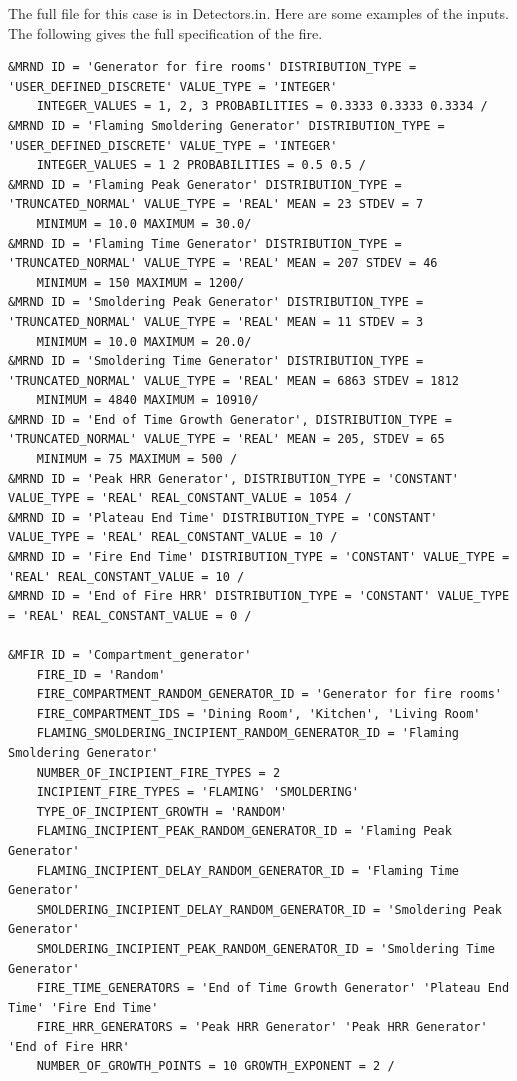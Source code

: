 \documentclass[12pt,twoside]{book}
\begin{document}
The full file for this case is in Detectors.in. Here are some examples of the inputs. The following gives the full specification of the fire.

\vspace{\baselineskip}
\begin{lstlisting}
&MRND ID = 'Generator for fire rooms' DISTRIBUTION_TYPE = 'USER_DEFINED_DISCRETE' VALUE_TYPE = 'INTEGER'
    INTEGER_VALUES = 1, 2, 3 PROBABILITIES = 0.3333 0.3333 0.3334 /
&MRND ID = 'Flaming Smoldering Generator' DISTRIBUTION_TYPE = 'USER_DEFINED_DISCRETE' VALUE_TYPE = 'INTEGER'
    INTEGER_VALUES = 1 2 PROBABILITIES = 0.5 0.5 /
&MRND ID = 'Flaming Peak Generator' DISTRIBUTION_TYPE = 'TRUNCATED_NORMAL' VALUE_TYPE = 'REAL' MEAN = 23 STDEV = 7
    MINIMUM = 10.0 MAXIMUM = 30.0/
&MRND ID = 'Flaming Time Generator' DISTRIBUTION_TYPE = 'TRUNCATED_NORMAL' VALUE_TYPE = 'REAL' MEAN = 207 STDEV = 46
    MINIMUM = 150 MAXIMUM = 1200/
&MRND ID = 'Smoldering Peak Generator' DISTRIBUTION_TYPE = 'TRUNCATED_NORMAL' VALUE_TYPE = 'REAL' MEAN = 11 STDEV = 3
    MINIMUM = 10.0 MAXIMUM = 20.0/
&MRND ID = 'Smoldering Time Generator' DISTRIBUTION_TYPE = 'TRUNCATED_NORMAL' VALUE_TYPE = 'REAL' MEAN = 6863 STDEV = 1812
    MINIMUM = 4840 MAXIMUM = 10910/
&MRND ID = 'End of Time Growth Generator', DISTRIBUTION_TYPE = 'TRUNCATED_NORMAL' VALUE_TYPE = 'REAL' MEAN = 205, STDEV = 65
    MINIMUM = 75 MAXIMUM = 500 /
&MRND ID = 'Peak HRR Generator', DISTRIBUTION_TYPE = 'CONSTANT' VALUE_TYPE = 'REAL' REAL_CONSTANT_VALUE = 1054 /
&MRND ID = 'Plateau End Time' DISTRIBUTION_TYPE = 'CONSTANT' VALUE_TYPE = 'REAL' REAL_CONSTANT_VALUE = 10 /
&MRND ID = 'Fire End Time' DISTRIBUTION_TYPE = 'CONSTANT' VALUE_TYPE = 'REAL' REAL_CONSTANT_VALUE = 10 /
&MRND ID = 'End of Fire HRR' DISTRIBUTION_TYPE = 'CONSTANT' VALUE_TYPE = 'REAL' REAL_CONSTANT_VALUE = 0 /

&MFIR ID = 'Compartment_generator'
	FIRE_ID = 'Random'
	FIRE_COMPARTMENT_RANDOM_GENERATOR_ID = 'Generator for fire rooms'
    FIRE_COMPARTMENT_IDS = 'Dining Room', 'Kitchen', 'Living Room'
    FLAMING_SMOLDERING_INCIPIENT_RANDOM_GENERATOR_ID = 'Flaming Smoldering Generator'
	NUMBER_OF_INCIPIENT_FIRE_TYPES = 2
    INCIPIENT_FIRE_TYPES = 'FLAMING' 'SMOLDERING'
	TYPE_OF_INCIPIENT_GROWTH = 'RANDOM'
	FLAMING_INCIPIENT_PEAK_RANDOM_GENERATOR_ID = 'Flaming Peak Generator'
    FLAMING_INCIPIENT_DELAY_RANDOM_GENERATOR_ID = 'Flaming Time Generator'
    SMOLDERING_INCIPIENT_DELAY_RANDOM_GENERATOR_ID = 'Smoldering Peak Generator'
    SMOLDERING_INCIPIENT_PEAK_RANDOM_GENERATOR_ID = 'Smoldering Time Generator'
	FIRE_TIME_GENERATORS = 'End of Time Growth Generator' 'Plateau End Time' 'Fire End Time'
	FIRE_HRR_GENERATORS = 'Peak HRR Generator' 'Peak HRR Generator' 'End of Fire HRR'
    NUMBER_OF_GROWTH_POINTS = 10 GROWTH_EXPONENT = 2 /
\end{lstlisting}
\end{document}
